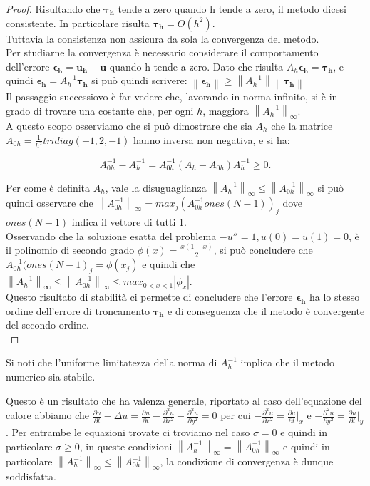 \begin{proof}
Risultando che $\boldsymbol{\tau_h}$ tende a zero quando h tende a zero, il metodo dicesi consistente. In particolare risulta $\boldsymbol{\tau_h} = O(h^2)$.\\
Tuttavia la consistenza non assicura da sola la convergenza del metodo.\\
Per studiarne la convergenza è necessario considerare il comportamento dell’errore $\boldsymbol{\epsilon_h} = \boldsymbol{u_h} -\boldsymbol{u}$ quando h tende a zero. Dato che risulta $A_h\boldsymbol{\epsilon_h} = \boldsymbol{\tau_h}$, e quindi $\boldsymbol{\epsilon_h} = A_h^{-1} \boldsymbol{\tau_h}$ si può quindi scrivere: $\left\|\boldsymbol{\epsilon_h}\right\|\geq \left\|A_h^{-1}\right\| \left\|\boldsymbol{\tau_h}\right\|$\\
Il passaggio successiovo è far vedere che, lavorando in norma infinito, si è in grado di trovare una costante che, per ogni $h$, maggiora $\left\|A_h^{-1}\right\|_{\infty} $. \\ 
A questo scopo osserviamo che si può dimostrare che sia $A_h$ che la matrice $A_{0h} = \frac{1}{h^2} tridiag(-1,2,-1)$ hanno inversa non negativa, e si ha: 

$$A_{0h}^{-1}-A_{h}^{-1}=A_{0h}^{-1}(A_h-A_{0h})A_h^{-1}\geq0.$$

Per come è definita $A_h$, vale la disuguaglianza $\left\|A_h^{-1}\right\|_{\infty} \leq \left\|A_{0h}^{-1}\right\|_{\infty} $
si può quindi osservare che
$\left\|A_{0h}^{-1}\right\|_{\infty} =max_j(A_{0h}^{-1}{ones(N-1)})_j$ dove ${ones(N-1)}$ indica il vettore di tutti 1.\\
Osservando che la soluzione esatta del problema $-u'' = 1, u(0) = u(1) = 0$, è il polinomio di secondo grado $\phi(x) = \frac{x(1-x)}{2}$, si può concludere che $A_{0h}^{-1}(ones(N-1)_j=\phi(x_j)$ e quindi che $\left\|A_h^{-1}\right\|_{\infty} \leq \left\|A_{0h}^{-1}\right\|_{\infty} \leq max_{0<x<1}|\phi_x|$.\\
Questo risultato di stabilità ci permette di concludere che l’errore $\boldsymbol{\epsilon_h}$ ha lo stesso ordine dell’errore di troncamento $\boldsymbol{\tau_h}$ e di conseguenza che il metodo è convergente del secondo ordine.\\
\end{proof}
\begin{osservazione}
Si noti che l’uniforme limitatezza della norma di $A_h^{-1}$ implica che il metodo numerico sia stabile.\\
\end{osservazione}
Questo è un risultato che ha valenza generale, riportato al caso dell'equazione del calore abbiamo che $\frac{\partial u}{\partial t} - \Delta u = \frac{\partial u}{\partial t} - \frac{\partial^2 u}{\partial x^2} - \frac{\partial^2 u}{\partial y^2} = 0$ per cui $-\frac{\partial^2 u}{\partial x^2}=\frac{\partial u}{\partial t}|_x$ e $-\frac{\partial^2 u}{\partial y^2}=\frac{\partial u}{\partial t}|_y$. Per entrambe le equazioni trovate ci troviamo nel caso $\sigma=0$ e quindi in particolare $\sigma\geq0$, in queste condizioni $\left\|A_h^{-1}\right\|_{\infty} = \left\|A_{0h}^{-1}\right\|_{\infty} $ e quindi in particolare $\left\|A_h^{-1}\right\|_{\infty} \leq \left\|A_{0h}^{-1}\right\|_{\infty} $, la condizione di convergenza è dunque soddisfatta.


